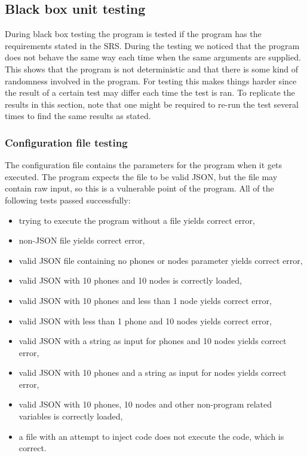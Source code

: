\documentclass{article}
\begin{document}
\subsection{Black box unit testing}
During black box testing the program is tested if the program has the requirements stated in the SRS. During the testing we noticed that the program does not behave the same way each time when the same arguments are supplied. This shows that the program is not deterministic and that there is some kind of randomness involved in the program. For testing this makes things harder since the result of a certain test may differ each time the test is ran. To replicate the results in this section, note that one might be required to re-run the test several times to find the same results as stated.

\subsubsection{Configuration file testing}
The configuration file contains the parameters for the program when it gets executed. The program expects the file to be valid JSON, but the file may contain raw input, so this is a vulnerable point of the program. All of the following tests passed successfully:
\begin{itemize}
    \item trying to execute the program without a file yields correct error,
    \item non-JSON file yields correct error,
    \item valid JSON file containing no phones or nodes parameter yields correct error,
    \item valid JSON with 10 phones and 10 nodes is correctly loaded,
    \item valid JSON with 10 phones and less than 1 node yields correct error,
    \item valid JSON with less than 1 phone and 10 nodes yields correct error,
    \item valid JSON with a string as input for phones and 10 nodes yields correct error,
    \item valid JSON with 10 phones and a string as input for nodes yields correct error,
    \item valid JSON with 10 phones, 10 nodes and other non-program related variables is correctly loaded,
    \item a file with an attempt to inject code does not execute the code, which is correct.
\end{itemize}
\end{document}
